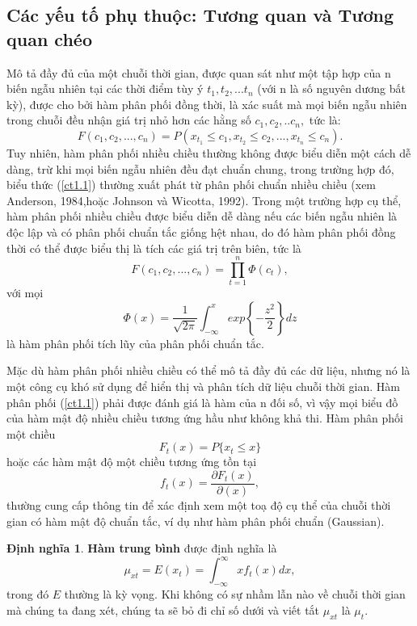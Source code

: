 \documentclass[12pt, a4paper,oneside]{book}
\theoremstyle{definition}
\newtheorem{dn}[theo]{Định nghĩa}
\begin{document}
\subsection{\label{ytph}Các yếu tố phụ thuộc: Tương quan và Tương quan chéo}

Mô tả đầy đủ của một chuỗi thời gian, được quan sát như một tập hợp của n biến ngẫu nhiên tại các thời điểm tùy ý $t_{1},t_{2},...t_{n}$ (với n là số nguyên dương bất kỳ), được cho bởi hàm phân phối đồng thời, là xác suất mà mọi biến ngẫu nhiên trong chuỗi đều nhận giá trị nhỏ hơn các hằng số $c_{1},c_{2},..c_{n},$ tức là:
\begin{equation}
	F(c_{1},c_{2},...,c_{n})= P(x_{t_{1}}\leq c_{1},x_{t_{2}}\leq c_{2},...,x_{t_{n}}\leq c_{n}). \label{ct1.1}
\end{equation}
Tuy nhiên, hàm phân phối nhiều chiều thường không được biểu diễn một cách dễ dàng, trừ khi mọi biến ngẫu nhiên đều đạt chuẩn chung, trong trường hợp đó, biểu thức (\ref{ct1.1}) thường xuất phát từ phân phối chuẩn nhiều chiều (xem Anderson, 1984,hoặc Johnson và Wicotta, 1992). Trong một trường hợp cụ thể, hàm phân phối nhiều chiều được biểu diễn dễ dàng nếu các biến ngẫu nhiên là độc lập và có phân phối chuẩn tắc giống hệt nhau, do đó hàm phân phối đồng thời có thể được biểu thị là tích các giá trị trên biên, tức là
\begin{equation}
	F(c_{1},c_{2},...,c_{n})=  \prod_{t=1}^{n}\Phi(c_{t}), \label{ct1.2}
\end{equation}
với mọi 
\begin{equation}
\Phi(x) = \dfrac{1}{\sqrt{2\pi}} \int_{-\infty}^{x} exp \left\lbrace -\dfrac{z^2}{2}\right\rbrace  dz \label{ct1.3}
\end{equation}
là hàm phân phối tích lũy của phân phối chuẩn tắc.

Mặc dù hàm phân phối nhiều chiều có thể mô tả đầy đủ các dữ liệu, nhưng nó là một công cụ khó sử dụng để hiển thị và phân tích dữ liệu chuỗi thời gian. Hàm phân phối (\ref{ct1.1}) phải được đánh giá là hàm của n đối số, vì vậy mọi biểu đồ của hàm mật độ nhiều chiều tương ứng hầu như không khả thi. Hàm phân phối một chiều
\begin{equation}
	{F}_{t}(x)= {P}\{x_{t}\leq x\} \label{ct1.4}
\end{equation}
hoặc các hàm mật độ một chiều tương ứng tồn tại
\begin{equation}
{f}_{t}(x)= \dfrac{\partial{F}_{t}(x)}{\partial(x)}, \label{ct1.5}
\end{equation}
thường cung cấp thông tin để xác định xem một toạ độ cụ thể của chuỗi thời gian có hàm mật độ chuẩn tắc, ví dụ như hàm phân phối chuẩn (Gaussian).
\begin{dn}\textbf{Hàm trung bình} được định nghĩa là
   \begin{equation}
	\mu_{xt} = E(x_{t}) =  \int_{-\infty}^{\infty} xf_{t}(x) dx, \label{ct1.6}
   \end{equation}
trong đó $E$ thường là kỳ vọng. Khi không có sự nhầm lẫn nào về chuỗi thời gian mà chúng ta đang xét, chúng ta sẽ bỏ đi chỉ số dưới và viết tắt $\mu_{xt}$ là $\mu_{t}$.
\end{dn}
\end{document}

